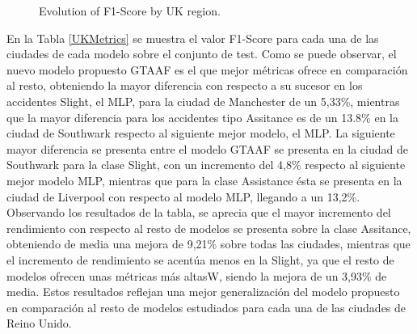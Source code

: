 \documentclass{uathesis-es}
\begin{document}
\begin{figure}[H]
    \caption{Evolution of F1-Score by UK region.}
 \label{UKLossFunction}
 \end{figure}


En la Tabla \ref{UKMetrics} se muestra el valor F1-Score para cada una de las ciudades de cada modelo sobre el conjunto de test. Como se puede observar, el nuevo modelo propuesto GTAAF es el que mejor métricas ofrece en comparación al resto, obteniendo la mayor diferencia con respecto a su sucesor en los accidentes Slight, el MLP, para la ciudad de Manchester de un 5,33\%, mientras que la mayor diferencia para los accidentes tipo Assitance es de un 13.8\% en la ciudad de Southwark respecto al siguiente mejor modelo, el MLP. La siguiente mayor diferencia se presenta entre el modelo GTAAF se presenta en la ciudad de Southwark para la clase Slight, con un incremento del 4,8\% respecto al siguiente mejor modelo MLP, mientras que para la clase Assistance ésta se presenta en la ciudad de Liverpool con respecto al modelo MLP, llegando a un 13,2\%. Observando los resultados de la tabla, se aprecia que el mayor incremento del rendimiento con respecto al resto de modelos se presenta sobre la clase Assitance, obteniendo de media una mejora de 9,21\% sobre todas las ciudades, mientras que el incremento de rendimiento se acentúa menos en la Slight, ya que el resto de modelos ofrecen unas métricas más altasW, siendo la mejora de un 3,93\% de media. Estos resultados reflejan una mejor generalización del modelo propuesto en comparación al resto de modelos estudiados para cada una de las ciudades de Reino Unido.
\end{document}
